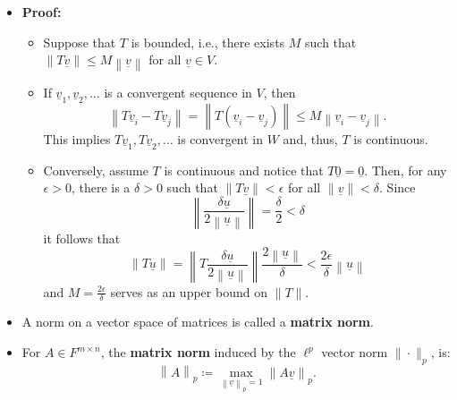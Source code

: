 \documentclass[11pt,twoside]{report}
\newcommand{\vecnot}{\underline}
\begin{document}
\begin{itemize}
\item \textbf{Proof:} 
\begin{itemize}
\item Suppose that $T$ is bounded, i.e.,  there exists $M$ such that  $\left\| T \vecnot{v} \right\| \leq M \left\| \vecnot{v} \right\|$ for all $\vecnot{v} \in V$.
\item If $\vecnot{v}_1, \vecnot{v}_2, \ldots$ is a convergent sequence in $V$, then 
\begin{equation*}
\left\| T \vecnot{v}_i - T \vecnot{v}_j \right\|
= \left\| T ( \vecnot{v}_i - \vecnot{v}_j ) \right\|
\leq  M \left\| \vecnot{v}_i - \vecnot{v}_j \right\| . 
\end{equation*}
This implies $T \vecnot{v}_1, T \vecnot{v}_2, \ldots$ is convergent in $W$ and, thus, $T$ is continuous.
\item Conversely, assume $T$ is continuous and notice that $T \vecnot{0} = \vecnot{0}$.
Then, for any $\epsilon > 0$, there is a $\delta>0$ such that $\| T \vecnot{v} \| < \epsilon$ for all $\| \vecnot{v} \| < \delta$. Since 
\[
\left\|  \frac{ \delta \vecnot{u} }{2 \left\| \vecnot{u} \right\| } \right\| = \frac{\delta}{2}  < \delta 
\]
it follows that
\begin{equation*}
\left\| T \vecnot{u} \right\|
= \left\| T \frac{ \delta \vecnot{u} }{2 \left\| \vecnot{u} \right\| } \right\|
\frac{ 2 \left\| \vecnot{u} \right\| }{ \delta }
< \frac{2 \epsilon}{ \delta } \left\| \vecnot{u} \right\|
\end{equation*}
and $M = \frac{2 \epsilon}{\delta}$ serves as an upper bound on $\|T\|$.
\end{itemize}

\item A norm on a vector space of matrices is called a \textbf{matrix norm}.

\item For $A\in F^{m\times n}$, the \textbf{matrix norm} induced by the $\ell^p$ vector norm $\|\cdot\|_p$,  is:
\[ \left\| A \right\|_p  \coloneqq \max_{\left\| \vecnot{v} \right\|_p = 1} \left\| A \vecnot{v} \right\|_p. \]


\end{itemize}
\end{document}
